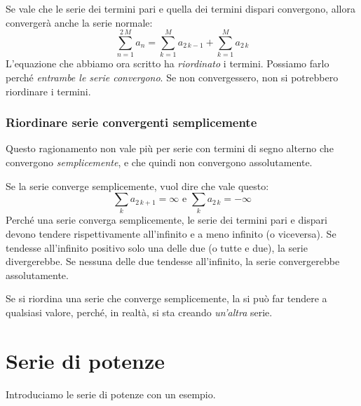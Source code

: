 Se vale che le serie dei termini pari e quella dei termini dispari convergono, allora converger\`a anche la serie normale:
\[
\sum_{n = 1}^{2 \, M} a_n = \sum_{k = 1}^{M} a_{2 \, k - 1} + \sum_{k = 1}^{M} a_{2 \, k}
\]
L'equazione che abbiamo ora scritto ha \emph{riordinato} i termini. Possiamo farlo perch\'e \emph{entrambe le serie convergono}. Se non convergessero, non si potrebbero riordinare i termini.

\subsubsection{Riordinare serie convergenti semplicemente}

Questo ragionamento non vale pi\`u per serie con termini di segno alterno che convergono \emph{semplicemente}, e che quindi non convergono assolutamente.

Se la serie converge semplicemente, vuol dire che vale questo:
\[
\sum_{k} a_{2 \, k + 1} = \infty \text{ e } \sum_{k} a_{2 \, k} = - \infty
\]
Perch\'e una serie converga semplicemente, le serie dei termini pari e dispari devono tendere rispettivamente all'infinito e a meno infinito (o viceversa). Se tendesse all'infinito positivo solo una delle due (o tutte e due), la serie divergerebbe. Se nessuna delle due tendesse all'infinito, la serie convergerebbe assolutamente.

Se si riordina una serie che converge semplicemente, la si pu\`o far tendere a qualsiasi valore, perch\'e, in realt\`a, si sta creando \emph{un'altra} serie.


\section{Serie di potenze}

Introduciamo le serie di potenze con un esempio.

